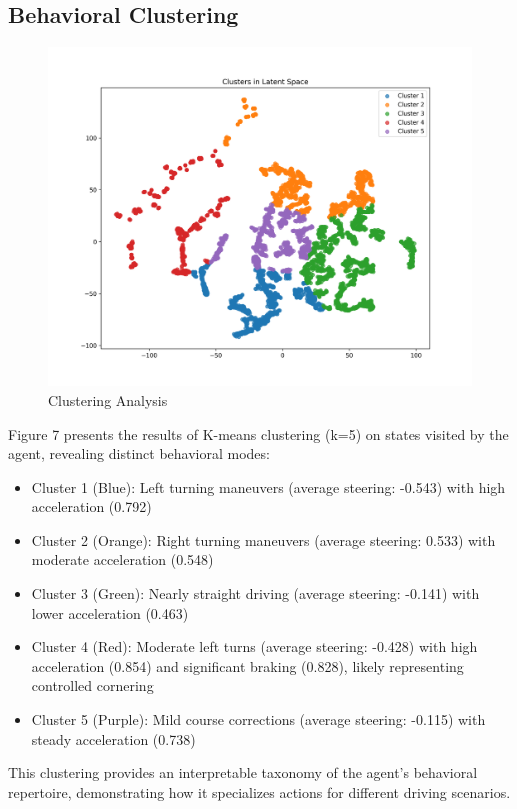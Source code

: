 \documentclass[conference]{IEEEtran}
\begin{document}
\subsection{Behavioral Clustering}
\begin{figure}
    \centering
    \includegraphics[width=0.5\linewidth]{Writeup/cluster.png}
    \caption{Clustering Analysis}
    \label{fig:enter-label}
\end{figure}
Figure 7 presents the results of K-means clustering (k=5) on states visited by the agent, revealing distinct behavioral modes:
\begin{itemize}
    \item Cluster 1 (Blue): Left turning maneuvers (average steering: -0.543) with high acceleration (0.792)
    \item Cluster 2 (Orange): Right turning maneuvers (average steering: 0.533) with moderate acceleration (0.548)
    \item Cluster 3 (Green): Nearly straight driving (average steering: -0.141) with lower acceleration (0.463)
    \item Cluster 4 (Red): Moderate left turns (average steering: -0.428) with high acceleration (0.854) and significant braking (0.828), likely representing controlled cornering
    \item Cluster 5 (Purple): Mild course corrections (average steering: -0.115) with steady acceleration (0.738)
\end{itemize}

This clustering provides an interpretable taxonomy of the agent's behavioral repertoire, demonstrating how it specializes actions for different driving scenarios.
\end{document}
